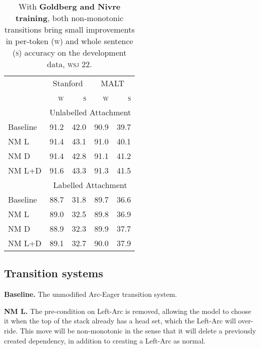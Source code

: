 \documentclass[11pt,letterpaper]{article}
\newcommand{\wsj}{\textsc{wsj}\xspace}
\begin{document}
\begin{table}[t]
    \small
    \centering
    \begin{tabular}{l|rrrr}
        \hline
        & \multicolumn{2}{c}{Stanford} & \multicolumn{2}{c}{MALT}  \\
        & \textsc{w}  & \textsc{s} & \textsc{w} & \textsc{s} \\
        \hline \hline
        & \multicolumn{4}{c}{Unlabelled Attachment} \\
        \hline
        Baseline & 91.2 & 42.0 & 90.9 & 39.7 \\
        NM L & 91.4 & 43.1 & 91.0 & 40.1 \\
        NM D & 91.4 & 42.8 & 91.1 & 41.2 \\
        NM L+D & 91.6 & 43.3 & 91.3 & 41.5 \\
        \hline
        & \multicolumn{4}{c}{Labelled Attachment} \\
        \hline
        Baseline & 88.7 & 31.8 & 89.7 & 36.6 \\
        NM L & 89.0 & 32.5 & 89.8 & 36.9 \\
        NM D & 88.9 & 32.3 & 89.9 & 37.7 \\
        NM L+D & 89.1 & 32.7 & 90.0 & 37.9 \\
        \hline
    \end{tabular}
    \caption{\small
        With \textbf{Goldberg and Nivre training}, both non-monotonic transitions
        bring small improvements in per-token (\textsc{w}) and whole sentence (\textsc{s})
        accuracy on the development data, \wsj 22.
        \label{tab:goldberg}}
\end{table}

\subsection{Transition systems}

\textbf{Baseline.} The unmodified Arc-Eager transition system.

\textbf{NM L.} The pre-condition on Left-Arc is removed, allowing the model to
choose it when the top of the stack already has a head set, which the Left-Arc will
over-ride. This move will be non-monotonic in the
sense that it will delete a previously created dependency, in addition to creating
a Left-Arc as normal.
\end{document}
